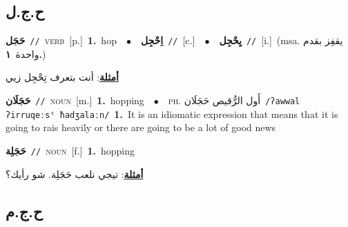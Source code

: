 \documentclass[10pt,a4paper,twoside]{article} %
\begin{document}
\begin{multicols}{2}
\vspace{-3mm}
\subsection*{\color{blue}\foreignlanguage{arabic}{ح.ج.ل}\color{blue}{}} 

{\setlength\topsep{0pt}\textbf{\foreignlanguage{arabic}{حَجَل}}\ {\color{gray}\texttt{//}\color{black}}\ \textsc{verb}\ [p.]\ \textbf{1.}~hop\ \ $\bullet$\ \ \setlength\topsep{0pt}\textbf{\foreignlanguage{arabic}{اِحْجِل}}\ {\color{gray}\texttt{//}\color{black}}\ [c.]\ \ $\bullet$\ \ \setlength\topsep{0pt}\textbf{\foreignlanguage{arabic}{يِحْجِل}}\ {\color{gray}\texttt{//}\color{black}}\ [i.]\ \color{gray}(msa. \foreignlanguage{arabic}{يقفِز بقدم واحدة}~\foreignlanguage{arabic}{\textbf{١.}})\color{black}\  \begin{flushright}\color{gray}\foreignlanguage{arabic}{\textbf{\underline{\foreignlanguage{arabic}{أمثلة}}}: أنت بتعرف تِحْجِل زيي}\end{flushright}\color{black}} \vspace{2mm}

{\setlength\topsep{0pt}\textbf{\foreignlanguage{arabic}{حَجَلَان}}\ {\color{gray}\texttt{//}\color{black}}\ \textsc{noun}\ [m.]\ \textbf{1.}~hopping\ \ $\bullet$\ \ \textsc{ph.} \color{gray} \foreignlanguage{arabic}{أَول الرُّقيص حَجَلَان}\color{black}\ {\color{gray}\texttt{/{\sffamily ʔawwal ʔirruqeːsˤ ħadʒalaːn}/}\color{black}}\ \textbf{1.}~It is an idiomatic expression that means that it is going to rais heavily or there are going to be a lot of good news\ } \vspace{2mm}

{\setlength\topsep{0pt}\textbf{\foreignlanguage{arabic}{حَجَلِة}}\ {\color{gray}\texttt{//}\color{black}}\ \textsc{noun}\ [f.]\ \textbf{1.}~hopping\  \begin{flushright}\color{gray}\foreignlanguage{arabic}{\textbf{\underline{\foreignlanguage{arabic}{أمثلة}}}: تيجي نلعب حَجَلِة. شو رأيك؟}\end{flushright}\color{black}} \vspace{2mm}

\vspace{-3mm}
\subsection*{\color{blue}\foreignlanguage{arabic}{ح.ج.م}\color{blue}{}} 


\end{multicols}
\end{document}
